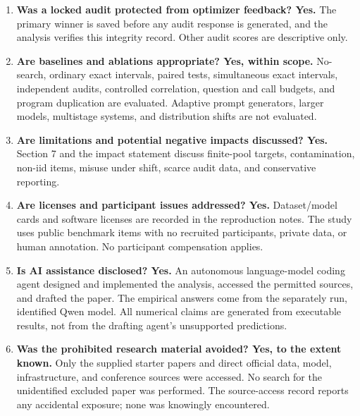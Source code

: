 \documentclass{article}
\begin{document}
\begin{enumerate}
\item \textbf{Was a locked audit protected from optimizer feedback? Yes.} The primary winner is saved before any audit response is generated, and the analysis verifies this integrity record. Other audit scores are descriptive only.
\item \textbf{Are baselines and ablations appropriate? Yes, within scope.} No-search, ordinary exact intervals, paired tests, simultaneous exact intervals, independent audits, controlled correlation, question and call budgets, and program duplication are evaluated. Adaptive prompt generators, larger models, multistage systems, and distribution shifts are not evaluated.
\item \textbf{Are limitations and potential negative impacts discussed? Yes.} Section 7 and the impact statement discuss finite-pool targets, contamination, non-iid items, misuse under shift, scarce audit data, and conservative reporting.
\item \textbf{Are licenses and participant issues addressed? Yes.} Dataset/model cards and software licenses are recorded in the reproduction notes. The study uses public benchmark items with no recruited participants, private data, or human annotation. No participant compensation applies.
\item \textbf{Is AI assistance disclosed? Yes.} An autonomous language-model coding agent designed and implemented the analysis, accessed the permitted sources, and drafted the paper. The empirical answers come from the separately run, identified Qwen model. All numerical claims are generated from executable results, not from the drafting agent's unsupported predictions.
\item \textbf{Was the prohibited research material avoided? Yes, to the extent known.} Only the supplied starter papers and direct official data, model, infrastructure, and conference sources were accessed. No search for the unidentified excluded paper was performed. The source-access record reports any accidental exposure; none was knowingly encountered.
\end{enumerate}
\end{document}
